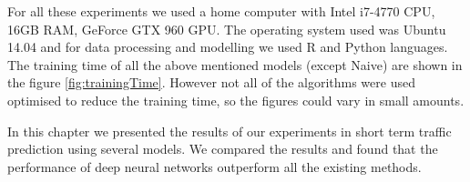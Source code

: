 For all these experiments we used a home computer with Intel i7-4770 CPU, 16GB RAM, GeForce GTX 960
GPU. The operating system used was Ubuntu 14.04 and for data processing and modelling we used R and
Python languages. The training time of all the above mentioned models (except Naive)  are shown in
the figure \ref{fig:trainingTime}. However not all of the algorithms were used optimised to reduce
the training time, so the figures could vary in small amounts.


In this chapter we presented the results of our experiments in short term traffic prediction using
several models. We compared the results and found that the performance of deep neural networks
outperform all the existing methods.